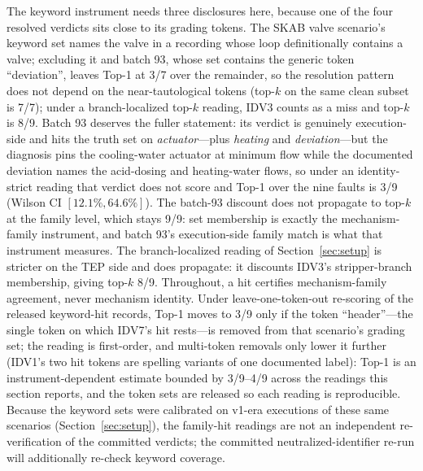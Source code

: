 \documentclass[preprint,10pt]{elsarticle}
\begin{document}
The keyword instrument needs three disclosures here, because one of the four resolved verdicts sits close to its grading tokens. The SKAB valve scenario's keyword set names the valve in a recording whose loop definitionally contains a valve; excluding it and batch 93, whose set contains the generic token ``deviation'', leaves Top-1 at 3/7 over the remainder, so the resolution pattern does not depend on the near-tautological tokens (top-$k$ on the same clean subset is 7/7); under a branch-localized top-$k$ reading, IDV3 counts as a miss and top-$k$ is 8/9. Batch 93 deserves the fuller statement: its verdict is genuinely execution-side and hits the truth set on \emph{actuator}---plus \emph{heating} and \emph{deviation}---but the diagnosis pins the cooling-water actuator at minimum flow while the documented deviation names the acid-dosing and heating-water flows, so under an identity-strict reading that verdict does not score and Top-1 over the nine faults is 3/9 (Wilson CI $[12.1\%,64.6\%]$). The batch-93 discount does not propagate to top-$k$ at the family level, which stays 9/9: set membership is exactly the mechanism-family instrument, and batch 93's execution-side family match is what that instrument measures. The branch-localized reading of Section~\ref{sec:setup} is stricter on the TEP side and does propagate: it discounts IDV3's stripper-branch membership, giving top-$k$ 8/9. Throughout, a hit certifies mechanism-family agreement, never mechanism identity. Under leave-one-token-out re-scoring of the released keyword-hit records, Top-1 moves to 3/9 only if the token ``header''---the single token on which IDV7's hit rests---is removed from that scenario's grading set; the reading is first-order, and multi-token removals only lower it further (IDV1's two hit tokens are spelling variants of one documented label): Top-1 is an instrument-dependent estimate bounded by 3/9--4/9 across the readings this section reports, and the token sets are released so each reading is reproducible. Because the keyword sets were calibrated on v1-era executions of these same scenarios (Section~\ref{sec:setup}), the family-hit readings are not an independent re-verification of the committed verdicts; the committed neutralized-identifier re-run will additionally re-check keyword coverage.
\end{document}
